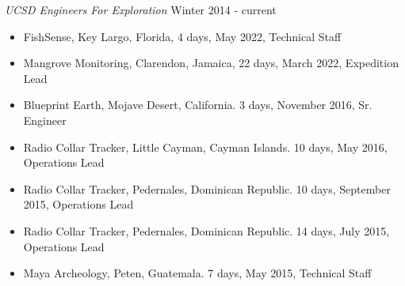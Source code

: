 \documentclass[line,margin]{res}
\begin{document}
\begin{resume}
	{\sl UCSD Engineers For Exploration} \hfill Winter 2014 - current
	\begin{itemize}
		\item FishSense, Key Largo, Florida, 4 days, May 2022, Technical Staff
		\item Mangrove Monitoring, Clarendon, Jamaica, 22 days, March 2022, Expedition Lead
		\item Blueprint Earth, Mojave Desert, California. 3 days, November 2016, Sr. Engineer
		\item Radio Collar Tracker, Little Cayman, Cayman Islands. 10 days, May 2016, Operations Lead
		\item Radio Collar Tracker, Pedernales, Dominican Republic. 10 days, September 2015, Operations Lead
		\item Radio Collar Tracker, Pedernales, Dominican Republic. 14 days, July 2015, Operations Lead
		\item Maya Archeology, Peten, Guatemala. 7 days, May 2015, Technical Staff
	\end{itemize}


\end{resume}
\end{document}
